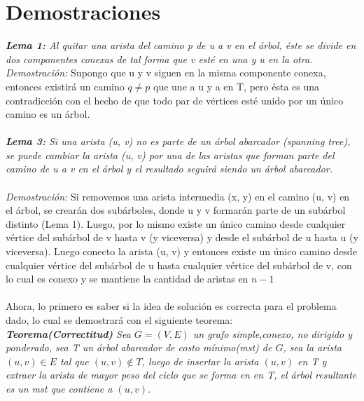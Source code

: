\documentclass[12pt]{article}
\begin{document}
 \newpage
 
 
\section{\textbf{Demostraciones}}

 
\textit{ \textbf{Lema 1:} Al quitar una arista del camino p de u a v en el \'arbol, \'este se divide en dos componentes conexas de tal forma que v est\'e en una y u en  la otra.}\\

\textit{Demostraci\'on:} Supongo que u y v siguen en la misma componente conexa, entonces existir\'a un camino $q \neq p$ que une a u y a  en T, pero \'esta es una contradicci\'on con el hecho de que todo par de v\'ertices est\'e unido por un \'unico camino es un \'arbol.\\
\\


\textit{ \textbf{Lema 3:} Si una arista (u, v) no es parte de un \'arbol abarcador (spanning tree), se puede cambiar la arista (u, v) por una de las aristas que forman parte del camino de u a v en el \'arbol y el resultado seguir\'a siendo un \'arbol abarcador.}\\
\\
\textit{Demostraci\'on:} Si removemos una arista intermedia (x, y) en el camino (u, v) en el \'arbol, se crear\'an dos sub\'arboles, donde u y v formar\'an parte de un 
sub\'arbol distinto (Lema 1).  Luego, por lo mismo existe un \'unico camino desde 
cualquier v\'ertice del sub\'arbol de v hasta v (y viceversa) y desde el sub\'arbol de u hasta u (y viceversa).  Luego conecto la arista (u, v) y entonces
existe un \'unico camino desde cualquier v\'ertice del sub\'arbol de u hasta cualquier v\'ertice del sub\'arbol de v, con lo cual es conexo y se mantiene la cantidad de aristas
en $n-1 $\\
\\


Ahora, lo primero es saber si la idea de soluci\'on es correcta para el problema dado, lo cual se demostrar\'a con el siguiente teorema:\\

\textit{\textbf{Teorema(Correctitud)} Sea $G=(V,E)$ un grafo simple,conexo, no dirigido y ponderado, sea T un \'arbol abarcador de costo m\'inimo(mst) de $G$, sea la arista $(u,v)\in E$ tal que $(u,v)\notin T$, luego de insertar la arista $(u,v)$ en T y extraer la 
arista de mayor peso del ciclo que se forma en en T, el \'arbol resultante es un mst que contiene a $(u,v)$.}
\end{document}
